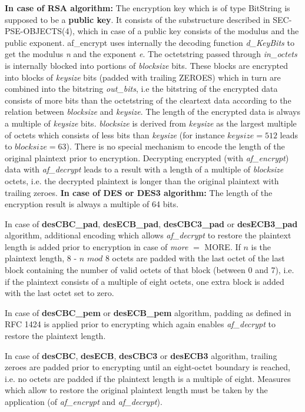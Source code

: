 {\bf In case of RSA algorithm:}
\be
\m The encryption key which is of type BitString is supposed to be
   a {\bf public key}. It consists of the substructure described in
   SEC-PSE-OBJECTS(4),
   which in case of a public key consists of the
   modulus and the public exponent. af\_encrypt uses internally the
   decoding function {\em d\_KeyBits} to get the modulus {\em n} and the exponent {\em e}.
\m The octetstring passed through {\em in\_octets} is internally blocked into portions of
   {\em blocksize} bits. These blocks are encrypted into blocks of {\em keysize} bits
   (padded with trailing ZEROES) which in turn are combined into the bitstring {\em out\_bits}, i.e
   the bitstring of the encrypted data consists of more bits than the octetstring of the cleartext data
   according to the relation between {\em blocksize} and {\em keysize}.
   The length of the encrypted data is always a multiple of {\em keysize} bits.
   {\em blocksize} is derived from {\em keysize} as the largest multiple of octets which consists of
   less bits than {\em keysize} (for instance $keysize = 512$ leads to $blocksize = 63$).
\m There is no special mechanism to encode the length of the original plaintext prior
   to encryption. Decrypting encrypted (with {\em af\_encrypt}) data with {\em af\_decrypt}
   leads to a result with a length of a multiple of {\em blocksize} octets, i.e. the decrypted
   plaintext is longer than the original plaintext with trailing zeroes.
\ee
{\bf In case of DES or DES3 algorithm:}
   The length of the encryption result is always a multiple of 64 bits.

   In case of {\bf desCBC\_pad}, {\bf desECB\_pad}, {\bf desCBC3\_pad} or 
   {\bf desECB3\_pad} algorithm, additional encoding which allows 
   {\em af\_decrypt} to restore the plaintext length is added prior
   to encryption in case of {\em more} $=$ MORE. If $n$ is the plaintext length,
   8 - $n$ $mod$ 8 octets are padded with
   the last octet of the last block containing the number of 
   valid octets of that block (between 0 and 7), i.e. if the plaintext consists 
   of a multiple of eight octets, one extra block is added with the last octet set to zero.

   In case of {\bf desCBC\_pem} or {\bf desECB\_pem} algorithm, 
   padding as defined in RFC 1424 is applied prior to encrypting
   which again enables {\em af\_decrypt} to restore the plaintext length.

   In case of {\bf desCBC}, {\bf desECB}, {\bf desCBC3} or {\bf desECB3} algorithm,
   trailing zeroes are padded prior to encrypting until an eight-octet boundary is reached, i.e.
   no octets are padded if the plaintext length is a multiple of eight.
   Measures which allow to restore the original plaintext length must
   be taken by the application (of {\em af\_encrypt} and {\em af\_decrypt}).

